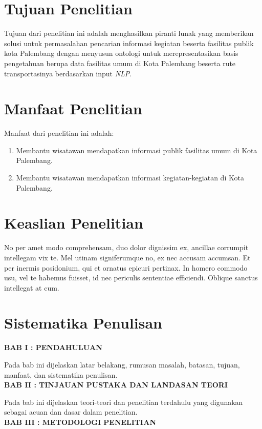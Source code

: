 \section{Tujuan Penelitian}
Tujuan dari penelitian ini adalah menghasilkan piranti lunak yang memberikan solusi untuk permasalahan pencarian informasi kegiatan beserta fasilitas publik kota Palembang dengan menyusun ontologi untuk merepresentasikan basis pengetahuan berupa data fasilitas umum di Kota Palembang beserta rute transportasinya berdasarkan input \emph{NLP}.


\section{Manfaat Penelitian}
Manfaat dari penelitian ini adalah:
\begin{enumerate}
  \item Membantu wisatawan mendapatkan informasi publik fasilitas umum di Kota Palembang.
  \item Membantu wisatawan mendapatkan informasi kegiatan-kegiatan di Kota Palembang.
\end{enumerate}

\section{Keaslian Penelitian}
No per amet modo comprehensam, duo dolor dignissim ex, ancillae corrumpit intellegam vix te. Mel utinam signiferumque no, ex nec accusam accumsan. Et per inermis posidonium, qui et ornatus epicuri pertinax. In homero commodo usu, vel te habemus fuisset, id nec periculis sententiae efficiendi. Oblique sanctus intellegat at cum.


\section{Sistematika Penulisan}
\noindent
\textbf{BAB I : PENDAHULUAN}

Pada bab ini dijelaskan latar belakang, rumusan masalah, batasan, tujuan, manfaat, dan sistematika penulisan.\\

\noindent
\textbf{BAB II : TINJAUAN PUSTAKA DAN LANDASAN TEORI}

Pada bab ini dijelaskan teori-teori dan penelitian terdahulu yang digunakan sebagai acuan dan dasar dalam penelitian.\\

\noindent
\textbf{BAB III : METODOLOGI PENELITIAN}

